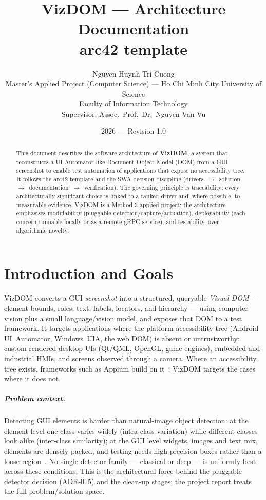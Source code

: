 \documentclass[11pt,a4paper]{report}
\title{\textbf{VizDOM --- Architecture Documentation}\\[0.3em]
\large arc42 template}
\author{Nguyen Huynh Tri Cuong\\
\small Master's Applied Project (Computer Science) --- Ho Chi Minh City University of Science\\
\small Faculty of Information Technology\\
\small Supervisor: Assoc.\ Prof.\ Dr.\ Nguyen Van Vu}
\date{2026 --- Revision 1.0}
\begin{document}
\maketitle

\begin{abstract}
\noindent This document describes the software architecture of \textbf{VizDOM}, a
system that reconstructs a UI-Automator-like Document Object Model (DOM) from a GUI
screenshot to enable test automation of applications that expose no accessibility
tree. It follows the arc42 template and the SWA decision discipline
(drivers~$\rightarrow$~solution~$\rightarrow$~documentation~$\rightarrow$~verification).
The governing principle is traceability: every architecturally significant choice is
linked to a ranked driver and, where possible, to measurable evidence. VizDOM is a
Method-3 applied project; the architecture emphasises modifiability (pluggable
detection/capture/actuation), deployability (each concern runnable locally or as a
remote gRPC service), and testability, over algorithmic novelty.
\end{abstract}

\tableofcontents

\chapter{Introduction and Goals}
VizDOM converts a GUI \emph{screenshot} into a structured, queryable
\emph{Visual DOM} --- element bounds, roles, text, labels, locators, and
hierarchy --- using computer vision plus a small language/vision model, and exposes
that DOM to a test framework. It targets applications where the platform
accessibility tree (Android UI~Automator, Windows~UIA, the web DOM) is absent or
untrustworthy: custom-rendered desktop UIs (Qt/QML, OpenGL, game engines), embedded
and industrial HMIs, and screens observed through a camera. Where an accessibility
tree exists, frameworks such as Appium build on it~\cite{uiautomator,appium}; VizDOM
targets the cases where it does not.

\paragraph{Problem context.} Detecting GUI elements is harder than natural-image
object detection: at the element level one class varies widely (intra-class
variation) while different classes look alike (inter-class similarity); at the GUI
level widgets, images and text mix, elements are densely packed, and testing needs
high-precision boxes rather than a loose region~\cite{xie2020uied}. No single
detector family --- classical or deep --- is uniformly best across these conditions.
This is the architectural force behind the pluggable detector decision (ADR-015) and
the clean-up stages; the project report treats the full problem/solution space.
\end{document}
